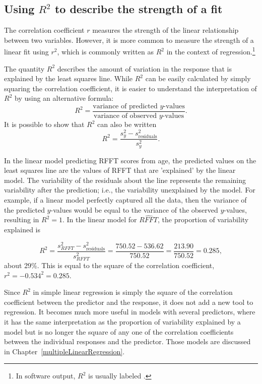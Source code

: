 

\textD{\newpage}


\subsection{Using $R^2$ to describe the strength of a fit}
\label{RSquaredLinearRegression}


The correlation coefficient $r$ measures the strength of the linear relationship between two variables. However, it is more common to measure the strength of a linear fit using $r^2$, which is commonly written as $R^2$ in the context of regression.\footnote{In software output, $R^2$ is usually labeled .} 

The quantity $R^2$ describes the amount of variation in the response that is explained by the least squares line. While $R^2$ can be easily calculated by simply squaring the correlation coefficient, it is easier to understand the interpretation of $R^2$ by using an alternative formula:
\[R^{2} = \dfrac{\text{variance of predicted $y$-values}}{\text{variance of observed $y$-values}}.\]
It is possible to show that $R^2$ can also be written
\[R^{2} = \dfrac{s^{2}_{y} - s_{\text{residuals}}^2}{s^{2}_{y}}.\]

In the linear model predicting RFFT scores from age, the predicted values on the least squares line are the values of RFFT that are 'explained' by the linear model. The variability of the residuals about the line represents the remaining variability after the prediction; i.e., the variability unexplained by the model. For example, if a linear model perfectly captured all the data, then the variance of the predicted $y$-values would be equal to the variance of the observed $y$-values, resulting in $R^2 = 1$. In the linear model for $\widehat{RFFT}$, the proportion of variability explained is

\[R^{2} = \dfrac{s^{2}_{RFFT} - s_{\text{residuals}}^2}{s^{2}_{RFFT}} = \dfrac{750.52 - 536.62}{750.52} = \dfrac{213.90}{750.52} = 0.285, \]
about 29\%. This is equal to the square of the correlation coefficient, $r^2 = -0.534^{2} = 0.285$. 

Since $R^2$ in simple linear regression is simply the square of the correlation coefficient between the predictor and the response, it does not add a new tool to regression.  It becomes much more useful in models with several predictors, where it has the same interpretation as the proportion of variability explained by a model but is no longer the square of any one of the correlation coefficients between the individual responses and the predictor.  Those models are discussed in Chapter~\ref{multipleLinearRegression}.

